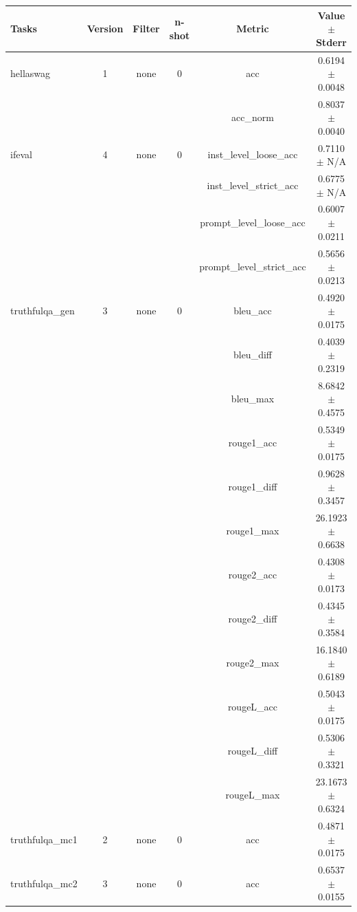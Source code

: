 \documentclass{ifacconf}
\begin{document}
\begin{strip}
\begin{minipage}{\textwidth}
    \begin{table}[H]
    \centering
    \begin{tabular}{|l|c|c|c|c|c|}
    \hline
    \textbf{Tasks} & \textbf{Version} & \textbf{Filter} & \textbf{n-shot} & \textbf{Metric} & \textbf{Value} $\pm$ \textbf{Stderr} \\ \hline
    hellaswag & 1 & none & 0 & acc & 0.6194 $\pm$ 0.0048 \\ \hline
    & & & & acc\_norm & 0.8037 $\pm$ 0.0040 \\ \hline
    ifeval & 4 & none & 0 & inst\_level\_loose\_acc & 0.7110 $\pm$ N/A \\ \hline
    & & & & inst\_level\_strict\_acc & 0.6775 $\pm$ N/A \\ \hline
    & & & & prompt\_level\_loose\_acc & 0.6007 $\pm$ 0.0211 \\ \hline
    & & & & prompt\_level\_strict\_acc & 0.5656 $\pm$ 0.0213 \\ \hline
    truthfulqa\_gen & 3 & none & 0 & bleu\_acc & 0.4920 $\pm$ 0.0175 \\ \hline
    & & & & bleu\_diff & 0.4039 $\pm$ 0.2319 \\ \hline
    & & & & bleu\_max & 8.6842 $\pm$ 0.4575 \\ \hline
    & & & & rouge1\_acc & 0.5349 $\pm$ 0.0175 \\ \hline
    & & & & rouge1\_diff & 0.9628 $\pm$ 0.3457 \\ \hline
    & & & & rouge1\_max & 26.1923 $\pm$ 0.6638 \\ \hline
    & & & & rouge2\_acc & 0.4308 $\pm$ 0.0173 \\ \hline
    & & & & rouge2\_diff & 0.4345 $\pm$ 0.3584 \\ \hline
    & & & & rouge2\_max & 16.1840 $\pm$ 0.6189 \\ \hline
    & & & & rougeL\_acc & 0.5043 $\pm$ 0.0175 \\ \hline
    & & & & rougeL\_diff & 0.5306 $\pm$ 0.3321 \\ \hline
    & & & & rougeL\_max & 23.1673 $\pm$ 0.6324 \\ \hline
    truthfulqa\_mc1 & 2 & none & 0 & acc & 0.4871 $\pm$ 0.0175 \\ \hline
    truthfulqa\_mc2 & 3 & none & 0 & acc & 0.6537 $\pm$ 0.0155 \\ \hline
    \end{tabular}
    \label{tab:qwen25_q5km}
    \end{table}


\end{minipage}
\end{strip}
\end{document}
